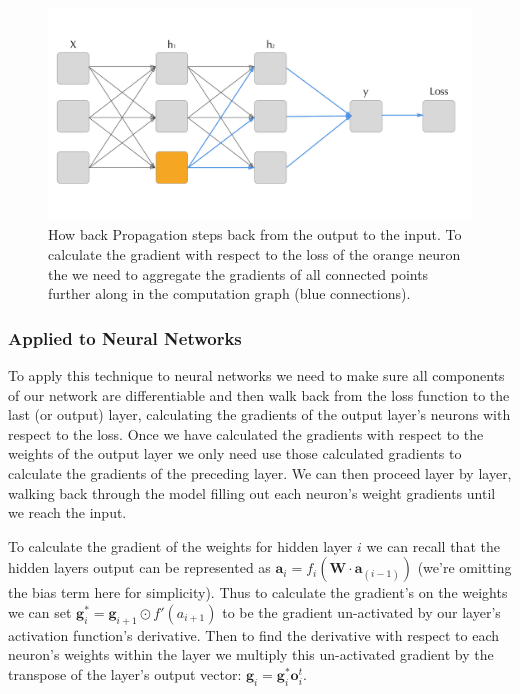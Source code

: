 \documentclass[]{book}
\theoremstyle{definition}
\theoremstyle{definition}
\theoremstyle{definition}
\theoremstyle{remark}
\begin{document}
\begin{figure}

{\centering \includegraphics{figures/backprop} 

}

\caption{How back Propagation steps back from the output to the input. To calculate the gradient with respect to the loss of the orange neuron the we need to aggregate the gradients of all connected points further along in the computation graph (blue connections).}\label{fig:unnamed-chunk-1}
\end{figure}

\subsubsection{Applied to Neural
Networks}\label{applied-to-neural-networks}

To apply this technique to neural networks we need to make sure all
components of our network are differentiable and then walk back from the
loss function to the last (or output) layer, calculating the gradients
of the output layer's neurons with respect to the loss. Once we have
calculated the gradients with respect to the weights of the output layer
we only need use those calculated gradients to calculate the gradients
of the preceding layer. We can then proceed layer by layer, walking back
through the model filling out each neuron's weight gradients until we
reach the input.

To calculate the gradient of the weights for hidden layer \(i\) we can
recall that the hidden layers output can be represented as
\(\textbf{a}_i = f_i(\textbf{W}\cdot\textbf{a}_{(i -1)})\) (we're
omitting the bias term here for simplicity). Thus to calculate the
gradient's on the weights we can set
\(\textbf{g}^*_i = \textbf{g}_{i+1} \odot f'(a_{i+1})\) to be the
gradient un-activated by our layer's activation function's derivative.
Then to find the derivative with respect to each neuron's weights within
the layer we multiply this un-activated gradient by the transpose of the
layer's output vector: \(\textbf{g}_i = \textbf{g}^*_i \textbf{o}_i^t\).
\end{document}
